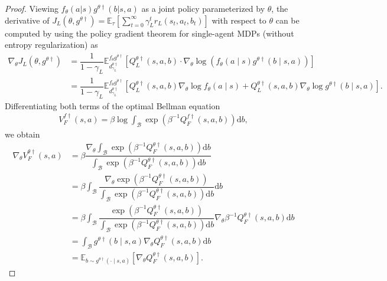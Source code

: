 \documentclass[letterpaper]{article} %
\providecommand{\E}{\mathbb{E}} %
\providecommand{\rmd}{\mathrm{d}} %
\begin{document}
\begin{proof}
Viewing $f_{\theta}(a| s)g^{\theta \dagger}(b| s,a)$ as a joint policy parameterized by $\theta$, the derivative of $J_L(\theta, g^{\theta\dagger})=\E_{\tau}\left[\sum_{t=0}^\infty \gamma_L^tr_L(s_t,a_t,b_t)\right]$ with respect to $\theta$ can be computed by using the policy gradient theorem for single-agent MDPs (without entropy regularization) as
\begin{subequations}
\begin{align}
    \nabla_{\theta}J_L(\theta, g^{\theta\dagger})
    &=\dfrac{1}{1-\gamma_L}\E_{d_{\gamma_L}^{\theta\dagger}}^{f_{\theta}g^{\theta \dagger}}\left[Q_L^{\theta \dagger}(s,a,b) \cdot \nabla_{\theta}\log\left(f_{\theta}(a\mid s)g^{\theta \dagger}(b\mid s,a)\right)\right]\\
    &=\dfrac{1}{1-\gamma_L}\E_{d_{\gamma_L}^{\theta\dagger}}^{f_{\theta}g^{\theta \dagger}}\left[Q_L^{\theta \dagger}(s,a,b)\nabla_{\theta}\log f_{\theta}(a\mid s)+Q_L^{\theta \dagger}(s,a,b)\nabla_{\theta}\log g^{\theta \dagger}(b\mid s,a)\right] .\label{eq:nabla_L_J_L_qr_bbf_first}
\end{align}
\end{subequations}
Differentiating both terms of the optimal Bellman equation
\begin{align}
    V_F^{f\dag}(s,a)=\beta\log\int_{\mathcal{B}}\exp\left(\beta^{-1}Q_F^{f\dag}(s,a,b)\right)\rmd b,
\end{align}
we obtain
\begin{subequations}
\begin{align}
    \nabla_{\theta}V_F^{\theta\dagger}(s,a)&=\beta\dfrac{\nabla_{\theta}\int_{\mathcal{B}}\exp\left(\beta^{-1}Q_F^{\theta\dagger}(s,a,b)\right)\rmd b}{\int_{\mathcal{B}}\exp\left(\beta^{-1}Q_F^{\theta\dagger}(s,a,b)\right)\rmd b}\\
    &=\beta\int_{\mathcal{B}}\dfrac{\nabla_{\theta}\exp\left(\beta^{-1}Q_F^{\theta\dagger}(s,a,b)\right)}{\int_{\mathcal{B}}\exp\left(\beta^{-1}Q_F^{\theta\dagger}(s,a,b)\right)\rmd b}\rmd b\\
    &=\beta\int_{\mathcal{B}}\dfrac{\exp\left(\beta^{-1}Q_F^{\theta\dagger}(s,a,b)\right)}{\int_{\mathcal{B}}\exp\left(\beta^{-1}Q_F^{\theta\dagger}(s,a,b)\right)\rmd b}\nabla_{\theta}\beta^{-1}Q_F^{\theta\dagger}(s,a,b)\rmd b\\
    &=\int_{\mathcal{B}}g^{\theta \dagger}(b\mid s,a)\nabla_{\theta}Q_F^{\theta\dagger}(s,a,b)\rmd b\\
    &=\E_{b\sim g^{\theta \dagger}(\cdot\mid s,a)}\left[\nabla_{\theta}Q_F^{\theta\dagger}(s,a,b)\right].

\end{align}
\end{subequations}
\end{proof}
\end{document}

